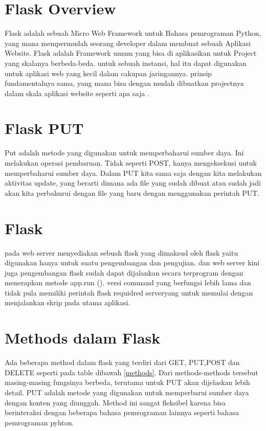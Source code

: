 \section{Flask Overview}
Flask adalah sebuah Micro Web Framework untuk Bahasa pemrograman Python, yang mana  mempermudah
seorang developer dalam membuat sebuah Aplikasi Website. Flask adalah Framework umum
yang bisa di aplikasikan untuk Project yang skalanya berbeda-beda. untuk sebuah 
instansi, hal itu dapat digunakan untuk aplikasi web yang kecil dalam cakupan jaringannya.
prinsip fundamentalnya sama, yang mana bisa dengan mudah dibuatkan projectnya dalam skala aplikasi
website seperti apa saja \cite{alemu2014rest}.

\section{Flask PUT}
Put adalah metode yang digunakan untuk memperbaharui sumber daya. Ini melakukan operasi pembaruan. 
Tidak seperti POST, hanya mengeksekusi untuk memperbaharui sumber daya. Dalam PUT kita sama saja dengan kita 
melakukan aktivitas update, yang berarti dimana ada file yang sudah dibuat atau sudah jadi akan kita perbahurui 
dengan file yang baru dengan menggunakan perintah PUT.

\section{Flask}
pada web server menyediakan sebuah flask yang dimaksud oleh flask yaitu digunakan hanya untuk suatu pengembangan dan pengujian. dan web server kini juga pengembangan flask sudah  dapat dijalankan secara terprogram dengan menerapkan metode app.run (). versi command yang  berfungsi lebih lama dan tidak pula memiliki perintah flask requidred serveryang untuk memulai dengan menjalankan skrip pada utama aplikasi.

\section{Methods dalam Flask}
Ada beberapa method dalam flask yang terdiri dari GET, PUT,POST dan DELETE seperti pada table dibawah \ref{methods}. Dari methods-methods tersebut masing-masing fungsinya berbeda, terutama untuk PUT akan dijelaskan lebih detail. PUT adalah metode yang digunakan untuk memperbarui sumber daya dengan konten yang diunggah. Method ini sangat fleksibel karena bisa berinteraksi dengan beberapa bahasa pemrograman lainnya seperti bahasa pemrograman pyhton.

